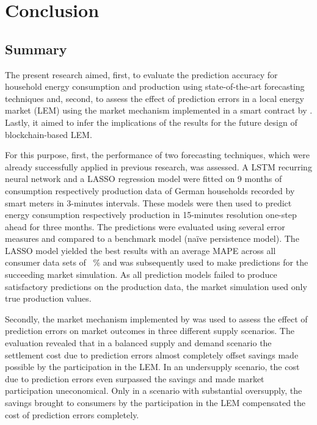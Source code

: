 
\section{Conclusion}\label{Sec:Conc}




\subsection{Summary}\label{Sec:Conclusion;Subsec:Summary}

The present research aimed, first, to evaluate the prediction accuracy for household energy consumption and production using state-of-the-art forecasting techniques and, second, to assess the effect of prediction errors in a local energy market (LEM) using the market mechanism implemented in a smart contract by \citet{Mengelkamp:2018a}. Lastly, it aimed to infer the implications of the results for the future design of blockchain-based LEM.

For this purpose, first, the performance of two forecasting techniques, which were already successfully applied in previous research, was assessed. A LSTM recurring neural network and a LASSO regression model were fitted on 9 months of consumption respectively production data of German households recorded by smart meters in 3-minutes intervals. These models were then used to predict energy consumption respectively production in 15-minutes resolution one-step ahead for three months. The predictions were evaluated using several error measures and compared to a benchmark model (na\"ive persistence model). The LASSO model yielded the best results with an average MAPE across all consumer data sets of ~\% and was subsequently used to make predictions for the succeeding market simulation. As all prediction models failed to produce satisfactory predictions on the production data, the market simulation used only true production values.

Secondly, the market mechanism implemented by \citet{Mengelkamp:2018a} was used to assess the effect of prediction errors on market outcomes in three different supply scenarios. The evaluation revealed that in a balanced supply and demand scenario the settlement cost due to prediction errors almost completely offset savings made possible by the participation in the LEM. In an undersupply scenario, the cost due to prediction errors even surpassed the savings and made market participation uneconomical. Only in a scenario with substantial oversupply, the savings brought to consumers by the participation in the LEM compensated the cost of prediction errors completely.

